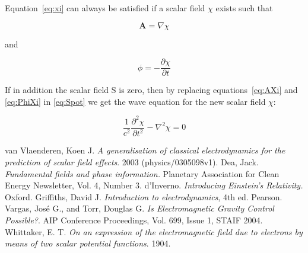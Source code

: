 \documentclass[english, 12pt]{book}
\begin{document}
Equation~\ref{eq:xi} can always be satisfied if a scalar field $\chi$ exists such that

\begin{equation}
\mathbf{A} = \nabla \chi      \label{eq:AXi}
\end{equation}

and

\begin{equation}
\phi = - \frac{\partial \chi}{\partial t}        \label{eq:PhiXi}
\end{equation}

If in addition the scalar field S is zero, then by replacing equations~\ref{eq:AXi} and \ref{eq:PhiXi} in \ref{eq:Spot} we get the wave equation for the new scalar field $\chi$:

\begin{equation}
\frac{1}{c^{2}}\frac{\partial^{2}\chi}{\partial t^{2}} - \nabla^{2}\chi = 0
\end{equation}











	
\begin{thebibliography}{99}
	 van Vlaenderen, Koen J. \emph{A generalisation of classical electrodynamics for the prediction of scalar field effects}. 2003 (physics/0305098v1).
	 Dea, Jack. \emph{Fundamental fields and phase information.} Planetary Association for Clean Energy Newsletter, Vol. 4, Number 3.
	 d'Inverno. \emph{Introducing Einstein's Relativity.} Oxford.
	 Griffiths, David J. \emph{Introduction to electrodynamics}, 4th ed. Pearson.
	 Vargas, José G., and Torr, Douglas G. \emph{Is Electromagnetic Gravity Control Possible?}. AIP Conference Proceedings, Vol. 699, Issue 1, STAIF 2004.
	 Whittaker, E. T. \emph{On an expression of the electromagnetic field due to electrons by means of two scalar potential functions}. 1904.
\end{thebibliography}
\end{document}
